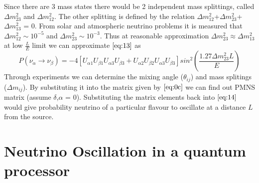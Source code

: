 \documentclass[12pt,a4paper]{report}
\begin{document}
Since there are 3 mass states there would be 2 independent mass splittings, called $\Delta m_{23}^{2}$ and $\Delta m_{12}^{2}$. The other splitting is defined by the relation $\Delta m_{12}^{2}$+$\Delta m_{23}^{2}$+$\Delta m_{13}^{2}$ = 0. From solar and atmospheric neutrino problems it is measured that $\Delta m_{12}^{2}\sim 10^{-5}$ and $\Delta m_{23}^{2} \sim 10^{-3}$. Thus at reasonable approximation $\Delta m_{23}^{2} \approx \Delta m_{13}^{2}$ at low $\frac{L}{E}$ limit we can approximate $\ref{eq:13}$ as
\begin{equation}
\label{eq:14}
P(\nu_{\alpha} \rightarrow \nu_{\beta} ) =-4 [ U_{\alpha 1} U_{\beta 1} U_{\alpha 3} U_{\beta 3} + U_{\alpha 2} U_{\beta 2} U_{\alpha 3} U_{\beta 3}]sin^{2}( \frac{1.27\Delta m_{23}^{2} L}{E})
\end{equation}
Through experiments we can determine the mixing angle ($ \theta_{ij}$) and mass splitings ($\Delta m_{ij}$). By substituting it into the matrix given by $\ref{eq:0c}$ we can find out PMNS matrix (assume $\delta$,$\alpha$ = 0). Substituting the matrix elements back into $\ref{eq:14}$ would give probability neutrino of a particular flavour to oscillate at a distance $L$ from the source.
\newpage
\thispagestyle{empty}
\mbox{}
\newpage
\chapter{Neutrino Oscillation in a quantum processor}
\end{document}
